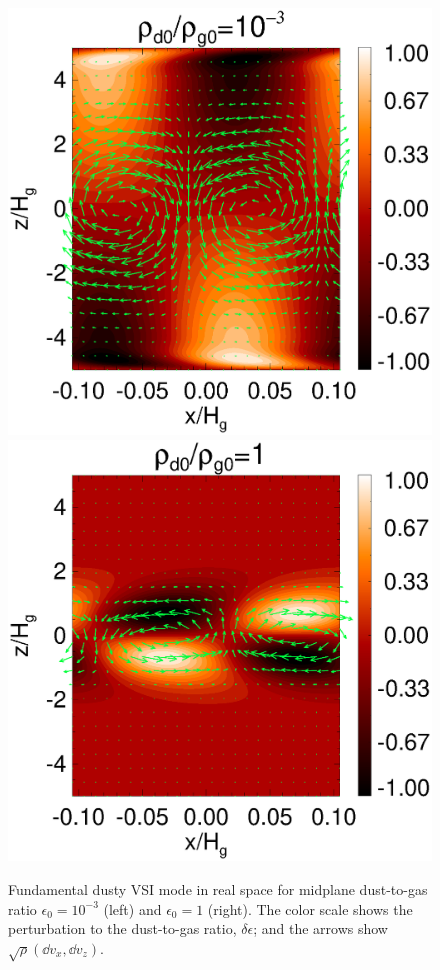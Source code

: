 \begin{figure}
\includegraphics[scale=0.32, clip=true, trim=0.5cm 0cm 3cm 0cm]{figures/result2d_dg1d-3.ps}\includegraphics[scale=0.32, clip=true, trim=1.8cm 0cm 0cm 0cm]{figures/result2d_dg1.ps}
  \caption{Fundamental dusty VSI mode in real space for midplane dust-to-gas
    ratio $\epsilon_0=10^{-3}$ (left) and $\epsilon_0=1$
    (right). The color scale shows the perturbation to the
    dust-to-gas ratio, $\delta\epsilon$; and the arrows show
    $\sqrt{\rho}\left(\dd v_x, \dd v_z\right)$. 
    \label{vsi_dust_loading2d}
    }
\end{figure}

